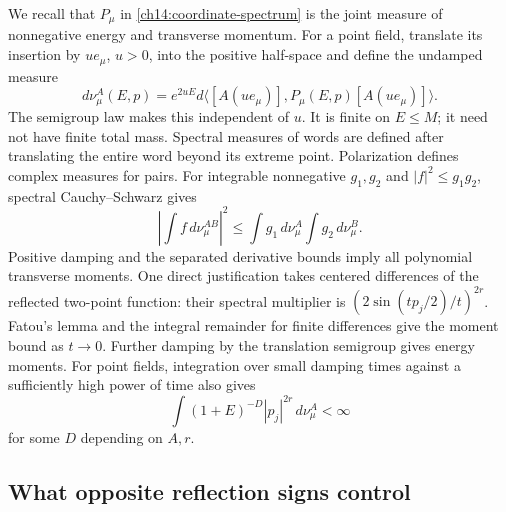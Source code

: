 We recall that $P_\mu$ in \eqref{ch14:coordinate-spectrum} is the
joint measure of nonnegative energy and transverse momentum.
For a point field, translate its insertion by $ue_\mu$, $u>0$,
into the positive half-space and define the undamped measure
\[
 d\nu_\mu^A(E,p)=e^{2uE}
       d\langle[A(ue_\mu)],P_\mu(E,p)[A(ue_\mu)]\rangle.
\]
The semigroup law makes this independent of $u$. It is finite on
$E\le M$; it need not have finite total mass. Spectral measures of words are
defined after translating the entire word beyond its extreme point.
Polarization defines complex measures for pairs. For integrable nonnegative
$g_1,g_2$ and $|f|^2\le g_1g_2$, spectral Cauchy--Schwarz gives
\begin{equation}\label{ch14:spectral-CS}
 \left|\int f\,d\nu_\mu^{AB}\right|^2
       \le\int g_1\,d\nu_\mu^A\int g_2\,d\nu_\mu^B.
\end{equation}
Positive damping and the separated derivative bounds imply all
polynomial transverse moments. One direct justification takes
centered differences of the reflected two-point function: their
spectral multiplier is $(2\sin(tp_j/2)/t)^{2r}$. Fatou's lemma
and the integral remainder for finite differences give the moment
bound as $t\to0$. Further damping by the translation semigroup gives energy moments.
For point fields, integration over small damping times against a
sufficiently high power of time also gives
\begin{equation}\label{ch14:polynomial-moments}
       \int (1+E)^{-D}|p_j|^{2r}\,d\nu_\mu^A<\infty
\end{equation}
for some $D$ depending on $A,r$.

\subsection{What opposite reflection signs control}

